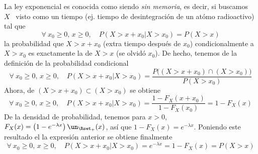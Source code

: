 La  ley exponencial  es conocida  como siendo  {\em sin  memoria}, es  decir, si
buscamos \  $X$ \  visto como un  tiempo (ej.  tiempo de desintegraci\'on  de un
at\'omo radioactivo) tal que
%
\[
\forall \: x_0 \ge 0, \, x \ge 0, \quad P( X > x+x_0 | X > x_0) = P(X > x)
\]
%
\ie  la  probabilidad  que  $X  >  x+x_0$  (extra  tiempo  despu\'es  de  $x_0$)
condicionalmente  a $X >  x_0$ es  exactamente la  de $X  > x$  (se olvid\'o
$x_0$). De hecho, tenemos de la definici\'on de la probabilidad condicional
%
\[
\forall \: x_0 \ge 0, \, x \ge 0, \quad P(X > x+x_0 | X > x_0) = \frac{P\big( (X > x+x_0) \cap (X > x_0) \big)}{P(X > x_0)}
\]
%
Ahora, de $(X > x+x_0) \subset (X > x_0)$ se obtiene
%
\[
\forall \: x_0 \ge 0, \, x \ge 0, \quad P(X > x+x_0 | X > x_0) = \frac{1-F_X(x+x_0)}{1-F_X(x_0)} = 1-F_X(x)
\]
%
De la  densidad de  probabilidad, tenemos  para $x >  0$, $F_X(x)  = \left(  1 -
  e^{-\lambda x} \right) \un_{\Rset_+}(x)$, as\'i  que $1 - F_X(x) = e^{-\lambda
  x}$. Poniendo este resultado el la expresi\'on anterior se obtiene finalmente
%
\[
\forall \: x_0 \ge 0, \, x \ge 0,  \quad P(X > x+x_0 | X > x_0) = e^{-\lambda x}
= 1-F_X(x) = P(X > x)
\]
%

